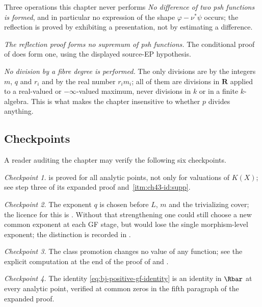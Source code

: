 \begin{warning}{Three operations this chapter never performs}
\label{warn:ch43-forbidden}
\emph{No difference of two psh functions is formed}, and in particular no
expression of the shape $\varphi-\nu^*\psi$ occurs; the reflection is
proved by exhibiting a presentation, not by estimating a difference.

\emph{The reflection proof forms no supremum of psh functions.}
The conditional proof of  does form one,
using the displayed source-EP hypothesis.

\emph{No division by a fibre degree is performed.}  The only divisions are by
the integers $m$, $q$ and $r_i$ and by the real number
$r_im_i$; all of them are divisions in $\mathbf R$ applied to a
real-valued or $-\infty$-valued maximum, never divisions in $k$ or in a
finite $k$-algebra.  This is what makes the chapter insensitive to whether
$p$ divides anything.
\end{warning}

\subsection{Checkpoints}
\label{sec:ch43-checkpoints}

A reader auditing the chapter may verify the following six checkpoints.

\emph{Checkpoint 1.}   is
proved for all analytic points, not only for valuations of $K(X)$; see
step three of its expanded proof and
\,\cref{itm:ch43-id:supp}.

\emph{Checkpoint 2.}  The exponent $q$ is chosen before $L$, $m$ and
the trivializing cover; the licence for this is
.  Without that strengthening one could
still choose a new common exponent at each GF stage, but would lose the
single morphism-level exponent; the distinction is recorded in
.

\emph{Checkpoint 3.}  The class promotion changes no value of any function;
see the explicit computation at the end of the proof of
 and
.

\emph{Checkpoint 4.}  The identity
\eqref{eq:bj-positive-gf-identity} is an identity in $\Rbar$ at every
analytic point, verified at common zeros in the fifth paragraph of the
expanded proof.

